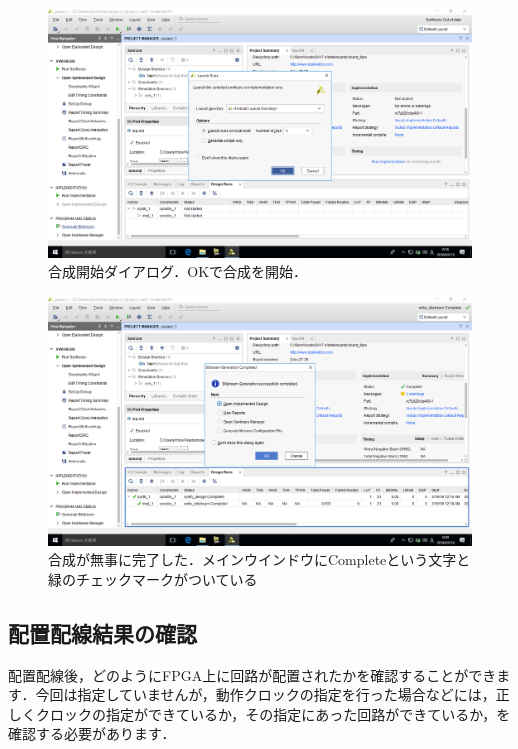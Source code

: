 \documentclass[a4paper,dvipdfmx]{jsarticle}
\begin{document}
 \begin{figure}[H]
  \begin{center}
   \includegraphics[width=.8\textwidth]{chapter03_figures/VirtualBox_Windows10_19_03_2018_00_16_46.png}
  \end{center}
  \caption{合成開始ダイアログ．OKで合成を開始．}
 \end{figure}

 \begin{figure}[H]
  \begin{center}
   \includegraphics[width=.8\textwidth]{chapter03_figures/VirtualBox_Windows10_19_03_2018_00_20_45.png}
  \end{center}
  \caption{合成が無事に完了した．メインウインドウにCompleteという文字と緑のチェックマークがついている \label{fig:completed}}
 \end{figure}

\subsection{配置配線結果の確認}

配置配線後，どのようにFPGA上に回路が配置されたかを確認することができます．今回は指定していませんが，動作クロックの指定を行った場合などには，正しくクロックの指定ができているか，その指定にあった回路ができているか，を確認する必要があります．
\end{document}
